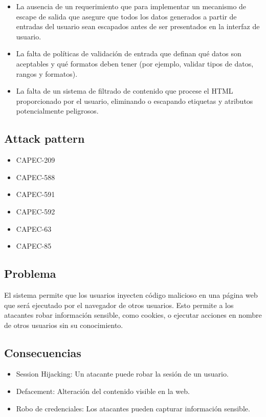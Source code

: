 \begin{itemize}
    \item La ausencia de un requerimiento que para implementar un mecanismo de escape de salida que asegure que todos los datos generados a partir de entradas del usuario sean escapados antes de ser presentados en la interfaz de usuario.
    \item La falta de políticas de validación de entrada que definan qué datos son aceptables y qué formatos deben tener (por ejemplo, validar tipos de datos, rangos y formatos).
    \item La falta de un sistema de filtrado de contenido que procese el HTML proporcionado por el usuario, eliminando o escapando etiquetas y atributos potencialmente peligrosos.
\end{itemize}

\subsection{Attack pattern}
\begin{itemize}
    \item CAPEC-209
    \item CAPEC-588
    \item CAPEC-591
    \item CAPEC-592
    \item CAPEC-63
    \item CAPEC-85
\end{itemize}

\subsection{Problema}

El sistema permite que los usuarios inyecten código malicioso en una página web que será ejecutado por el navegador de otros usuarios. Esto permite a los atacantes robar información sensible, como cookies, o ejecutar acciones en nombre de otros usuarios sin su conocimiento.

\subsection{Consecuencias}

\begin{itemize}
    \item Session Hijacking: Un atacante puede robar la sesión de un usuario.
    \item Defacement: Alteración del contenido visible en la web.
    \item Robo de credenciales: Los atacantes pueden capturar información sensible.
\end{itemize}

